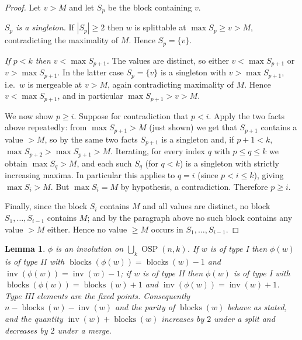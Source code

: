\documentclass[11pt]{amsart}
\newtheorem{lemma}[theorem]{Lemma}
\theoremstyle{definition}
\DeclareMathOperator{\OSP}{OSP}
\DeclareMathOperator{\inv}{inv}
\DeclareMathOperator{\blocks}{blocks}
\begin{document}
\begin{proof}
Let $v>M$ and let $S_p$ be the block containing $v$.

\emph{$S_p$ is a singleton.} If $|S_p|\ge2$ then $w$ is splittable at
$\max S_p\ge v>M$, contradicting the maximality of $M$. Hence $S_p=\{v\}$.

\emph{If $p<k$ then $v<\max S_{p+1}$.} The values are distinct, so either
$v<\max S_{p+1}$ or $v>\max S_{p+1}$. In the latter case $S_p=\{v\}$ is a
singleton with $v>\max S_{p+1}$, i.e.\ $w$ is mergeable at $v>M$, again
contradicting maximality of $M$. Hence $v<\max S_{p+1}$, and in particular
$\max S_{p+1}>v>M$.

We now show $p\ge i$. Suppose for contradiction that $p<i$. Apply the two facts
above repeatedly: from $\max S_{p+1}>M$ (just shown) we get that $S_{p+1}$
contains a value $>M$, so by the same two facts $S_{p+1}$ is a singleton and, if
$p+1<k$, $\max S_{p+2}>\max S_{p+1}>M$. Iterating, for every index $q$ with
$p\le q\le k$ we obtain $\max S_q>M$, and each such $S_q$ (for $q<k$) is a
singleton with strictly increasing maxima. In particular this applies to $q=i$
(since $p<i\le k$), giving $\max S_i>M$. But $\max S_i=M$ by hypothesis, a
contradiction. Therefore $p\ge i$.

Finally, since the block $S_i$ contains $M$ and all values are distinct, no block
$S_1,\dots,S_{i-1}$ contains $M$; and by the paragraph above no such block
contains any value $>M$ either. Hence no value $\ge M$ occurs in
$S_1,\dots,S_{i-1}$.
\end{proof}

\begin{lemma}\label{lem:phi-props}
$\phi$ is an involution on $\bigcup_{k}\OSP(n,k)$. If $w$ is of type I then
$\phi(w)$ is of type II with $\blocks(\phi(w))=\blocks(w)-1$ and
$\inv(\phi(w))=\inv(w)-1$; if $w$ is of type II then $\phi(w)$ is of type I with
$\blocks(\phi(w))=\blocks(w)+1$ and $\inv(\phi(w))=\inv(w)+1$. Type III elements
are the fixed points. Consequently $n-\blocks(w)-\inv(w)$ and the parity of
$\blocks(w)$ behave as stated, and the quantity $\inv(w)+\blocks(w)$ increases by
$2$ under a split and decreases by $2$ under a merge.
\end{lemma}
\end{document}
